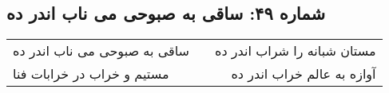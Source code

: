 \begin{center}
\section*{شماره ۴۹: ساقی به صبوحی می ناب اندر ده}
\label{sec:049}
\begin{longtable}{l p{0.5cm} r}
ساقی به صبوحی می ناب اندر ده
&&
مستان شبانه را شراب اندر ده
\\
مستیم و خراب در خرابات فنا
&&
آوازه به عالم خراب اندر ده
\\
\end{longtable}
\end{center}
